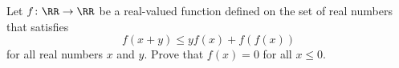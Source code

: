 Let $f \colon \RR \to \RR$ be a real-valued function
defined on the set of real numbers that satisfies
\[ f(x+y) \leq yf(x) + f(f(x))\]
for all real numbers $x$ and $y$.
Prove that $f(x) = 0$ for all $x \leq 0$.